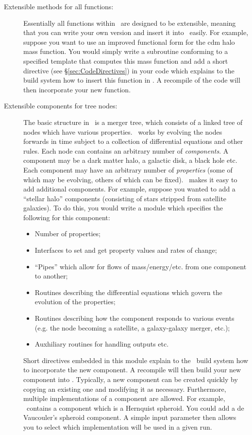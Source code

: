 \begin{description}
 \item [Extensible methods for all functions:] Essentially all functions within \glc\ are designed to be extensible, meaning that you can write your own version and insert it into \glc\ easily. For example, suppose you want to use an improved functional form for the \gls{cdm} halo mass function. You would simply write a subroutine conforming to a specified template that computes this mass function and add a short directive (see \S\ref{sec:CodeDirectives}) in your code which explains to the build system how to insert this function in \glc. A recompile of the code will then incorporate your new function.

 \item [Extensible components for tree nodes:] The basic structure in \glc\ is a merger tree, which consists of a linked tree of nodes which have various properties. \glc\ works by evolving the nodes forwards in time subject to a collection of differential equations and other rules. Each node can contains an arbitrary number of \emph{components}. A component may be a dark matter halo, a galactic disk, a black hole etc. Each component may have an arbitrary number of \emph{properties} (some of which may be evolving, others of which can be fixed). \glc\ makes it easy to add additional components. For example, suppose you wanted to add a ``stellar halo'' components (consisting of stars stripped from satellite galaxies). To do this, you would write a module which specifies the following for this component:
 \begin{itemize}
  \item Number of properties;
  \item Interfaces to set and get property values and rates of change;
  \item ``Pipes'' which allow for flows of mass/energy/etc. from one component to another;
  \item Routines describing the differential equations which govern the evolution of the properties;
  \item Routines describing how the component responds to various events (e.g. the node becoming a satellite, a galaxy-galaxy merger, etc.);
  \item Auxhiliary routines for handling outputs etc.
 \end{itemize}
 Short directives embedded in this module explain to the \glc\ build system how to incorporate the new component. A recompile will then build your new component into \glc. Typically, a new component can be created quickly by copying an existing one and modifying it as necessary. Furthermore, multiple implementations of a component are allowed. For example, \glc\ contains a component which is a Hernquist spheroid. You could add a de Vaucouler's spheroid component. A simple input parameter then allows you to select which implementation will be used in a given run.


\end{description}
